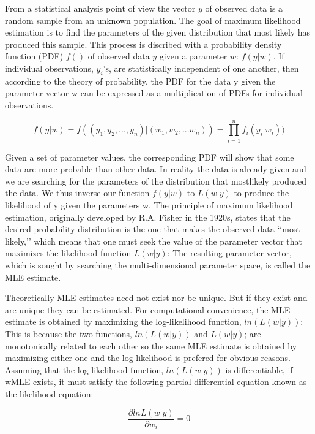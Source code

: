 \documentclass{article}
\begin{document}
    From a statistical analysis point of view the vector $y$ of observed data is a random sample from an unknown population. The goal of maximum likelihood estimation is to find the parameters of the given distribution that most likely has produced this sample. This process is discribed with a probability density function (PDF) $f()$ of observed data $y$ given a parameter $w$: $f(y|w)$. If individual observations, $y_i$’s, are statistically independent of one another, then according to the theory of probability, the PDF for the data y given the parameter vector w can be expressed as a multiplication of PDFs for individual observations.

    \begin{equation} f(y|w) = f((y_1, y_2,...,y_n) | (w_1,w_2, ... w_n )) = \prod_{i=1}^{n} f_i(y_i|w_i) ) \end{equation}

    Given a set of parameter values, the corresponding PDF will show that some data are more probable than other data. In reality the data is already given and we are searching for the parameters of the distribution that mostlikely produced the data. We thus inverse our function $f(y|w)$ to $L(w|y)$ to produce the likelihood of y given the parameters w. The principle of maximum likelihood estimation, originally developed by R.A. Fisher in the 1920s, states that the desired probability distribution is the one that makes the observed data ‘‘most likely,’’ which means that one must seek the value of the parameter vector that maximizes the likelihood function $L(w|y)$: The resulting parameter vector, which is sought by searching the multi-dimensional parameter space, is called the MLE estimate.

    Theoretically MLE estimates need not exist nor be unique. But if they exist and are unique they can be estimated. For computational convenience, the MLE estimate is obtained by maximizing the log-likelihood function, $ln(L(w|y))$: This is because the two functions, $ln(L(w|y))$ and $L(w|y)$; are monotonically related to each other so the same MLE estimate is obtained by maximizing either one and the log-likelihood is prefered for obvious reasons. Assuming that the log-likelihood function, $ln(L(w|y))$ is differentiable, if wMLE exists, it must satisfy the following partial differential equation known as the likelihood equation:

    \begin{equation} \frac{\partial ln L(w|y)}{\partial w_i} = 0 \end{equation}
\end{document}
